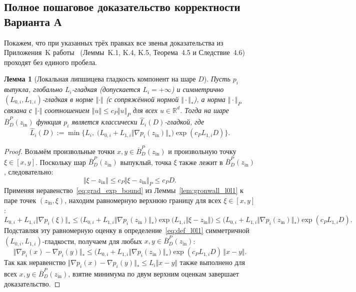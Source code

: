 \documentclass[11pt, a4paper]{article}
\newtheorem{lemma}{Лемма}[section]
\theoremstyle{definition}
\begin{document}
\subsection{Полное пошаговое доказательство корректности Варианта А}

Покажем, что при указанных трёх правках все звенья доказательства из Приложения~K работы~\cite{Borodich2025} (Леммы~K.1, K.4, K.5, Теорема~4.5 и Следствие~4.6) проходят без единого пробела.

\begin{lemma}[Локальная липшицева гладкость компонент на шаре $D$]\label{lem:local_L_on_ball}
Пусть $p_i$ выпукла, глобально $L_i$-гладкая (допускается $L_i = +\infty$) и симметрично $(L_{0,i}, L_{1,i})$-гладкая в норме $\Vert \cdot \Vert$ (с сопряжённой нормой $\Vert \cdot \Vert_*$), а норма $\Vert \cdot \Vert_P$ связана с $\Vert \cdot \Vert$ соотношением $\Vert u \Vert \le c_P \Vert u \Vert_P$ для всех $u \in \mathbb{R}^d$. Тогда на шаре $\overline{B}_D^P(z_{\mathrm{in}})$ функция $p_i$ является классически $\widehat{L}_i(D)$-гладкой, где
\begin{equation}\label{eq:hat_Li_D}
\widehat{L}_i(D) := \min\Big\{L_i,\; \big(L_{0,i} + L_{1,i} \Vert \nabla p_i(z_{\mathrm{in}}) \Vert_*\big) \exp(c_P L_{1,i} D)\Big\}.
\end{equation}
\end{lemma}

\begin{proof}
Возьмём произвольные точки $x, y \in \overline{B}_D^P(z_{\mathrm{in}})$ и произвольную точку $\xi \in [x, y]$. Поскольку шар $\overline{B}_D^P(z_{\mathrm{in}})$ выпуклый, точка $\xi$ также лежит в $\overline{B}_D^P(z_{\mathrm{in}})$, следовательно:
\[
\Vert \xi - z_{\mathrm{in}} \Vert \le c_P \Vert \xi - z_{\mathrm{in}} \Vert_P \le c_P D.
\]
Применяя неравенство~\eqref{eq:grad_exp_bound} из Леммы~\ref{lem:gronwall_l0l1} к паре точек $(z_{\mathrm{in}}, \xi)$, находим равномерную верхнюю границу для всех $\xi \in [x, y]$:
\[
L_{0,i} + L_{1,i} \Vert \nabla p_i(\xi) \Vert_* \le \big(L_{0,i} + L_{1,i} \Vert \nabla p_i(z_{\mathrm{in}}) \Vert_*\big) \exp\big(L_{1,i} \Vert \xi - z_{\mathrm{in}} \Vert\big) \le \big(L_{0,i} + L_{1,i} \Vert \nabla p_i(z_{\mathrm{in}}) \Vert_*\big) \exp(c_P L_{1,i} D).
\]
Подставляя эту равномерную оценку в определение~\eqref{eq:def_l0l1} симметричной $(L_{0,i}, L_{1,i})$-гладкости, получаем для любых $x, y \in \overline{B}_D^P(z_{\mathrm{in}})$:
\[
\Vert \nabla p_i(x) - \nabla p_i(y) \Vert_* \le \big(L_{0,i} + L_{1,i} \Vert \nabla p_i(z_{\mathrm{in}}) \Vert_*\big) \exp(c_P L_{1,i} D) \, \Vert x - y \Vert.
\]
Так как неравенство $\Vert \nabla p_i(x) - \nabla p_i(y) \Vert_* \le L_i \Vert x - y \Vert$ также выполнено для всех $x, y \in \overline{B}_D^P(z_{\mathrm{in}})$, взятие минимума по двум верхним оценкам завершает доказательство.
\end{proof}
\end{document}
